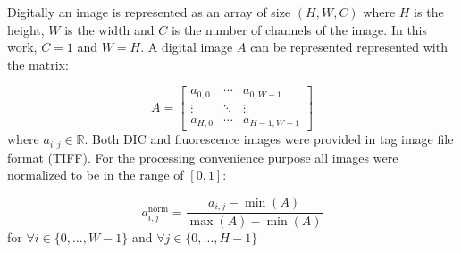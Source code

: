 Digitally an image is represented as an array of size $(H, W, C)$ where $H$ is the height, $W$ is the width and $C$ is the number of channels of the image. In this work, $C = 1$ and $W = H$. A digital image $A$ can be represented represented with the matrix:

\begin{equation}
    A = \left[
            \begin{array}{ccc}
                a_{0,0} & \cdots & a_{0,W-1} \\
                \vdots & \ddots & \vdots \\
                a_{H, 0} & \cdots & a_{H-1, W-1}
            \end{array}
        \right]
\end{equation}
where $a_{i, j} \in \mathbb{R}$. Both DIC and fluorescence images were provided in tag image file format (TIFF). For the processing convenience purpose all images were normalized to be in the range of $[0, 1]$:

\begin{equation}
    a^{\text{norm}}_{i,j} = \frac{a_{i, j} - \min(A)}{\max(A) - \min(A)}
\end{equation}
for $ \forall i \in \{0, ..., W - 1\}$ and $ \forall j \in \{0, ..., H - 1\}$